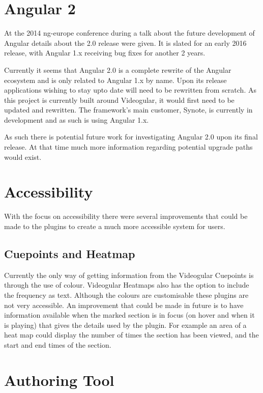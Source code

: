 \section{Angular 2}

At the 2014 ng-europe conference during a talk about the future development of Angular details about the 2.0 release were given. It is slated for an early 2016 release, with Angular 1.x receiving bug fixes for another 2 years. 

Currently it seems that Angular 2.0 is a complete rewrite of the Angular ecosystem and is only related to Angular 1.x by name. Upon its release applications wishing to stay upto date will need to be rewritten from scratch. As this project is currently built around Videogular, it would first need to be updated and rewritten. The framework's main customer, Synote, is currently in development and as such is using Angular 1.x. 

As such there is potential future work for investigating Angular 2.0 upon its final release. At that time much more information regarding potential upgrade paths would exist.

\section{Accessibility}

With the focus on accessibility there were several improvements that could be made to the plugins to create a much more accessible system for users.

\subsection{Cuepoints and Heatmap}

Currently the only way of getting information from the \gls{Videogular} Cuepoints is through the use of colour. \gls{Videogular} Heatmaps also has the option to include the frequency as text. Although the colours are customisable these plugins are not very accessible. An improvement that could be made in future is to have information available when the marked section is in focus (on hover and when it is playing) that gives the details used by the plugin. For example an area of a heat map could display the number of times the section has been viewed, and the start and end times of the section.

\section{Authoring Tool}

